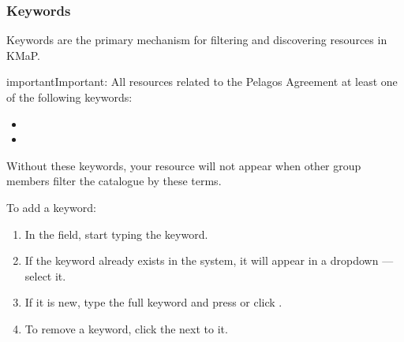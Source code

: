 \documentclass[letterpaper,10pt,english]{sphinxmanual}
\begin{document}
\subsubsection{Keywords}
\label{\detokenize{en/03_managing_metadata:keywords}}
\sphinxAtStartPar
Keywords are the primary mechanism for filtering and discovering resources in KMaP.

\begin{sphinxadmonition}{important}{Important:}
\sphinxAtStartPar
All resources related to the Pelagos Agreement  at least one of the
following keywords:
\begin{itemize}
\item {} 
\sphinxAtStartPar
{}

\item {} 
\sphinxAtStartPar
{}

\end{itemize}

\sphinxAtStartPar
Without these keywords, your resource will not appear when other group members
filter the catalogue by these terms.
\end{sphinxadmonition}

\sphinxAtStartPar
To add a keyword:
\begin{enumerate}
%
\item {} 
\sphinxAtStartPar
In the  field, start typing the keyword.

\item {} 
\sphinxAtStartPar
If the keyword already exists in the system, it will appear in a dropdown — select it.

\item {} 
\sphinxAtStartPar
If it is new, type the full keyword and press  or click .

\item {} 
\sphinxAtStartPar
To remove a keyword, click the  next to it.

\end{enumerate}
\end{document}
